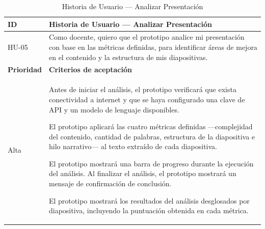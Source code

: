 \documentclass[11pt]{article}
\begin{document}
\begin{table}[H]
    \centering
    \renewcommand{\arraystretch}{1.2}
    \begin{tabular}{|p{2.5cm}|p{11cm}|}
        \hline
        \textbf{ID} & \textbf{Historia de Usuario — Analizar Presentación} \\
        \hline
        HU-05 & Como docente, quiero que el prototipo analice mi presentación con base en las métricas definidas, para identificar áreas de mejora en el contenido y la estructura de mis diapositivas. \\
        \hline
        \textbf{Prioridad} & \textbf{Criterios de aceptación} \\
        \hline
        Alta & Antes de iniciar el análisis, el prototipo verificará que exista conectividad a internet y que se haya configurado una clave de API y un modelo de lenguaje disponibles.
        
        El prototipo aplicará las cuatro métricas definidas —complejidad del contenido, cantidad de palabras, estructura de la diapositiva e hilo narrativo— al texto extraído de cada diapositiva. 
        
        El prototipo mostrará una barra de progreso durante la ejecución del análisis. Al finalizar el análisis, el prototipo mostrará un mensaje de confirmación de conclusión. 
        
        El prototipo mostrará los resultados del análisis desglosados por diapositiva, incluyendo la puntuación obtenida en cada métrica. \\
        \hline
    \end{tabular}
    \caption{Historia de Usuario — Analizar Presentación}
    \label{tab:hu-analizar-presentacion}
\end{table}
\end{document}
